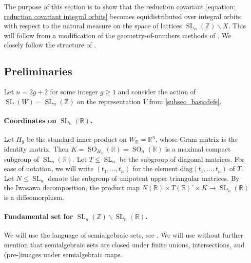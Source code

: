 \documentclass{article} %
\numberwithin{equation}{section}
\DeclareMathOperator{\SL}{SL}
\DeclareMathOperator{\SO}{SO}
\newcommand{\R}{\mathbb{R}}
\newcommand{\Z}{\mathbb{Z}}
\begin{document}
The purpose of this section is to show that the reduction covariant \eqref{equation: reduction covariant integral orbits} becomes equidistributed over integral orbits with respect to the natural measure on the space of lattices $\SL_n(\Z)\backslash X$. 
This will follow from a modification of the geometry-of-numbers methods of \cite[\S4]{bhargava2015mosthyperellipticarepointless}. 
We closely follow the structure of \cite[\S3]{lagathorne2024smallheightoddhyperelliptic}.






\subsection{Preliminaries}\label{subsec_preliminariescounting}

Let $n=2g+2$ for some integer $g\geq 1$ and consider the action of $\SL(W) = \SL_n(\Z)$ on the representation $V$ from \ref{subsec_basicdefs}.


\paragraph{Coordinates on $\SL_n(\R)$.}


Let $H_0$ be the standard inner product on $W_{\R} = \R^n$, whose Gram matrix is the identity matrix.
Then $K = \SO_{H_0}(\R) = \SO_n(\R)$ is a maximal compact subgroup of $\SL_n(\R)$.
Let $T  \leq \SL_n$ be the subgroup of diagonal matrices.
For ease of notation, we will write $(t_1,\dots,t_n)$ for the element $\text{diag}(t_1,\dots,t_n)$ of $T$.
Let $N \leq \SL_n$ denote the subgroup of unipotent upper triangular matrices. 
By the Iwasawa decomposition, the product map $N(\R)\times T(\R)^{\circ} \times K \rightarrow \SL_n(\R)$ is a diffeomorphism.




\paragraph{Fundamental set for $\SL_n(\Z)\backslash \SL_n(\R)$.}
We will use the language of semialgebraic sets, see \cite[Chapter 2]{BCR-realalgebraicgeometry}. We will use without further mention that semialgebraic sets are closed under finite unions, intersections, and (pre-)images under semialgebraic maps.
\end{document}
